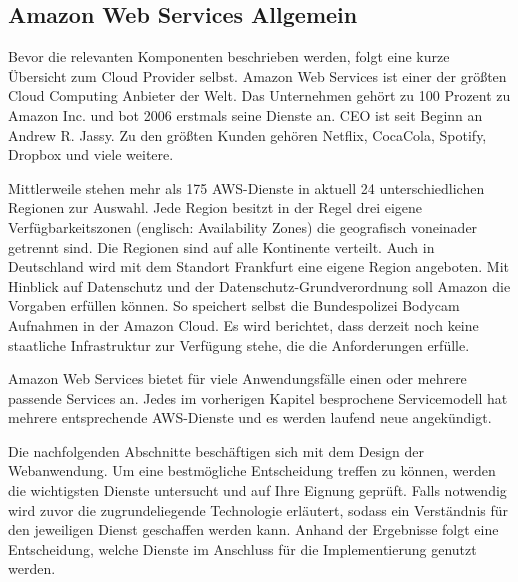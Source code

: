 \subsection{Amazon Web Services Allgemein}

Bevor die relevanten Komponenten beschrieben werden, folgt eine kurze Übersicht zum Cloud Provider selbst.
Amazon Web Services ist einer der größten Cloud Computing Anbieter der Welt. Das Unternehmen gehört zu 100 Prozent zu Amazon Inc. und bot 2006 erstmals seine Dienste an. CEO ist seit Beginn an Andrew R. Jassy.
Zu den größten Kunden gehören Netflix, CocaCola, Spotify, Dropbox und viele weitere. \cite{AWSAllgemein}

Mittlerweile stehen mehr als 175 AWS-Dienste in aktuell 24 unterschiedlichen Regionen zur Auswahl.
Jede Region besitzt in der Regel drei eigene Verfügbarkeitszonen (englisch: Availability Zones) die geografisch voneinader getrennt sind.
Die Regionen sind auf alle Kontinente verteilt.
Auch in Deutschland wird mit dem Standort Frankfurt eine eigene Region angeboten.
Mit Hinblick auf Datenschutz und der Datenschutz-Grundverordnung soll Amazon die Vorgaben erfüllen können.
So speichert selbst die Bundespolizei Bodycam Aufnahmen in der Amazon Cloud.\cite{AWSPolizei}
Es wird berichtet, {}\glqq dass derzeit noch keine staatliche Infrastruktur zur Verfügung stehe, die die Anforderungen erfülle.\grqq{}
\cite[Abschnitt 1]{AWSPolizei}

Amazon Web Services bietet für viele Anwendungsfälle einen oder mehrere passende Services an.
Jedes im vorherigen Kapitel besprochene Servicemodell hat mehrere entsprechende AWS-Dienste und es werden laufend neue angekündigt.


Die nachfolgenden Abschnitte beschäftigen sich mit dem Design der Webanwendung.
Um eine bestmögliche Entscheidung treffen zu können, werden die wichtigsten Dienste untersucht und auf Ihre Eignung geprüft.
Falls notwendig wird zuvor die zugrundeliegende Technologie erläutert, sodass ein Verständnis für den jeweiligen Dienst geschaffen werden kann.
Anhand der Ergebnisse folgt eine Entscheidung, welche Dienste im Anschluss für die Implementierung genutzt werden.




